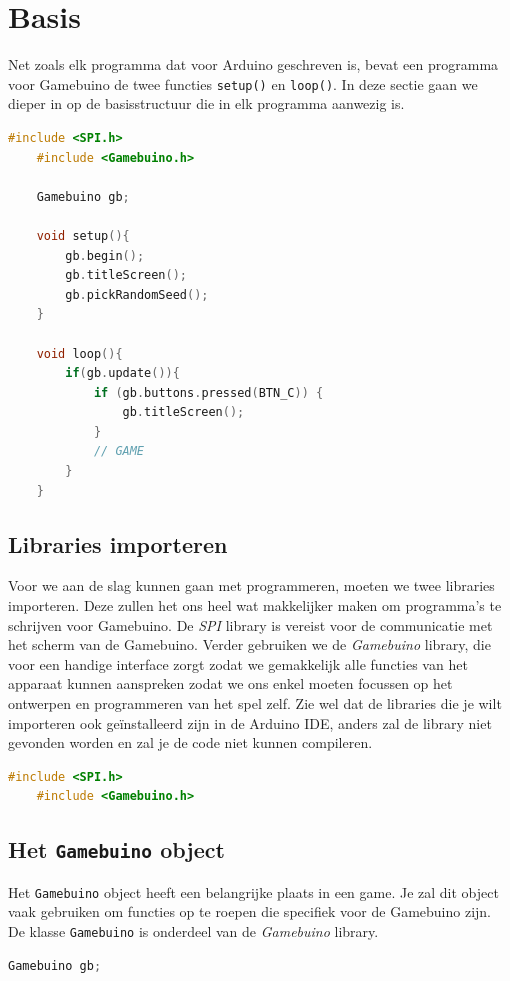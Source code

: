 \documentclass[a4paper,titlepage,12pt]{article}
\begin{document}
	\section{Basis}
	Net zoals elk programma dat voor Arduino geschreven is, bevat een programma voor Gamebuino de twee functies \texttt{setup()} en \texttt{loop()}. In deze sectie gaan we dieper in op de basisstructuur die in elk programma aanwezig is.
	
	\begin{lstlisting}[language=C++, caption=Structuur van een Gamebuino programma]
	#include <SPI.h>
	#include <Gamebuino.h>
	
	Gamebuino gb;
	
	void setup(){
		gb.begin();
		gb.titleScreen();
		gb.pickRandomSeed();
	}
	
	void loop(){
		if(gb.update()){
			if (gb.buttons.pressed(BTN_C)) {
				gb.titleScreen();
			}
			// GAME
		}
	}
	\end{lstlisting}
	
	
	\subsection{Libraries importeren}
	Voor we aan de slag kunnen gaan met programmeren, moeten we twee libraries importeren. Deze zullen het ons heel wat makkelijker maken om programma's te schrijven voor Gamebuino. De \emph{SPI} library is vereist voor de communicatie met het scherm van de Gamebuino. Verder gebruiken we de \emph{Gamebuino} library, die voor een handige interface zorgt zodat we gemakkelijk alle functies van het apparaat kunnen aanspreken zodat we ons enkel moeten focussen op het ontwerpen en programmeren van het spel zelf.
	Zie wel dat de libraries die je wilt importeren ook geïnstalleerd zijn in de Arduino IDE, anders zal de library niet gevonden worden en zal je de code niet kunnen compileren.
	\begin{lstlisting}[language=C++, caption={Importeren van libraries}]
	#include <SPI.h>
	#include <Gamebuino.h>
	\end{lstlisting}
	
	
	\subsection{Het \texttt{Gamebuino} object}
	Het \texttt{Gamebuino} object heeft een belangrijke plaats in een game. Je zal dit object vaak gebruiken om functies op te roepen die specifiek voor de Gamebuino zijn. De klasse \texttt{Gamebuino} is onderdeel van de \emph{Gamebuino} library.
	\begin{lstlisting}[language=C++, caption={Aanmaken van een \texttt{Gamebuino} object}]
	Gamebuino gb;
	\end{lstlisting}
	
\end{document}
